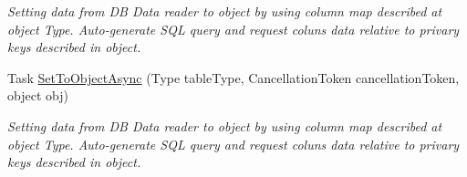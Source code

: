 \begin{DoxyCompactItemize}
\begin{DoxyCompactList}\small\item\em Setting data from DB Data reader to object by using column map described at object Type. Auto-\/generate S\+QL query and request coluns data relative to privary keys described in object. \end{DoxyCompactList}\item 
Task \mbox{\hyperlink{interface_uniform_data_operator_1_1_sql_1_1_i_sql_operator_a497325acf359d4f8444ee0c2ff858e6e}{Set\+To\+Object\+Async}} (Type table\+Type, Cancellation\+Token cancellation\+Token, object obj)
\begin{DoxyCompactList}\small\item\em Setting data from DB Data reader to object by using column map described at object Type. Auto-\/generate S\+QL query and request coluns data relative to privary keys described in object. \end{DoxyCompactList}\end{DoxyCompactItemize}
